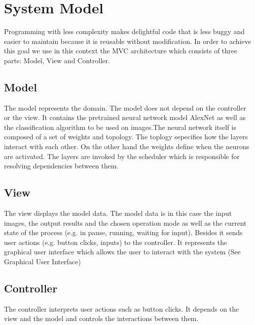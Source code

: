 \documentclass[parskip=full]{scrartcl}
\begin{document}
\pagebreak





\section{System Model}

Programming with less complexity makes delightful code that is less buggy and easier to maintain because it is reusable without modification. In order to achieve this goal we use in this context the MVC architecture which consists of three parts: Model, View and Controller.

\subsection{Model}

The model represents the domain. The model does not depend on the controller or the view. It contains the pretrained neural network model AlexNet as well as the classification algorithm to be used on images.The neural network itself is composed of a set of weights and topology. The toplogy sepecifies how the layers interact with each other. On the other hand the weights define when the neurons are activated. The layers are invoked by the scheduler which is responsible for resolving dependencies between them.

\subsection{View}

The view displays the model data. The model data is in this case the input images,  the output results and the chosen operation mode as well as the current state of the process (e.g. in pause, running, waiting for input). Besides it sends user actions (e.g. button clicks, inputs) to the controller. It represents the graphical user interface which allows the user to interact with the system (See Graphical User Interface)

\subsection{Controller}

The controller interprets user actions such as button clicks. It depends on the view and the model and controls the interactions between them.

\pagebreak
\end{document}
